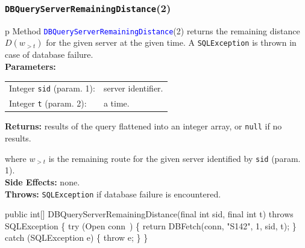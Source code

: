 \documentclass{article}
\def\nwendcode{\endtrivlist \endgroup}      %
\let\nwdocspar=\par
\theoremstyle{definition}                   %
\begin{document}
\subsubsection{{\tt{}\protect{}DBQueryServerRemainingDistance}(2)}
\begin{tabular}{p{\textwidth}}
\toprule
{}
Method \textcolor{blue}{{\tt{}\protect{}DBQueryServerRemainingDistance}}(2) returns the
remaining distance $D(w_{>t})$ for the given server at the given time.
A {\tt{}SQLException} is thrown in case of database failure.\\
\midrule
\textbf{Parameters:} \\
\begin{tabular}{lp{116mm}}
Integer {\tt{}sid} (param. 1):&server identifier.\\
Integer {\tt{}t} (param. 2):&a time.\\
\end{tabular}
\textbf{Returns:} results of the query flattened into an integer array,
or {\tt{}null} if no results.


where $w_{>t}$ is the remaining route for the given server identified by {\tt{}sid} (param. 1).\\
\textbf{Side Effects:} none.\\
\textbf{Throws:} {\tt{}SQLException} if database failure is encountered.\\
\bottomrule
\end{tabular}
\nwenddocs{}\endmoddef{}
public int[] DBQueryServerRemainingDistance(final int sid, final int t)
throws SQLException \{
  try (\LA{}Open \code{}conn\edoc{}~{\nwtagstyle{}}\RA{}) \{
    return DBFetch(conn, "S142", 1, sid, t);
  \} catch (SQLException e) \{
    throw e;
  \}
\}
\eatline
{}\nwendcode{}\nwdocspar
\end{document}
